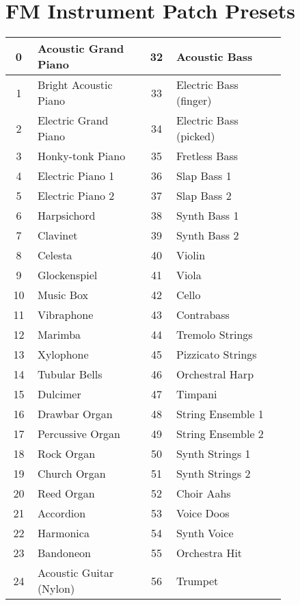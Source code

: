 \chapter{FM Instrument Patch Presets}
\begin{tabular}{|c|p{0.4\linewidth}|c|p{0.4\linewidth}|}
	\hline
	0  &  Acoustic Grand Piano  & 32  &  Acoustic Bass  \\ \hline
	1  &  Bright Acoustic Piano  & 33  &  Electric Bass (finger)  \\ \hline
	2  &  Electric Grand Piano  & 34  &  Electric Bass (picked)  \\ \hline
	3  &  Honky-tonk Piano  & 35  &  Fretless Bass  \\ \hline
	4  &  Electric Piano 1  & 36  &  Slap Bass 1  \\ \hline
	5  &  Electric Piano 2  & 37  &  Slap Bass 2  \\ \hline
	6  &  Harpsichord  & 38  &  Synth Bass 1  \\ \hline
	7  &  Clavinet  & 39  &  Synth Bass 2  \\ \hline
	8  &  Celesta  & 40  &  Violin  \\ \hline
	9  &  Glockenspiel  & 41  &  Viola  \\ \hline
	10  &  Music Box  & 42  &  Cello  \\ \hline
	11  &  Vibraphone  & 43  &  Contrabass  \\ \hline
	12  &  Marimba  & 44  &  Tremolo Strings  \\ \hline
	13  &  Xylophone  & 45  &  Pizzicato Strings  \\ \hline
	14  &  Tubular Bells  & 46  &  Orchestral Harp  \\ \hline
	15  &  Dulcimer  & 47  &  Timpani  \\ \hline
	16  &  Drawbar Organ  & 48  &  String Ensemble 1  \\ \hline
	17  &  Percussive Organ  & 49  &  String Ensemble 2  \\ \hline
	18  &  Rock Organ  & 50  &  Synth Strings 1  \\ \hline
	19  &  Church Organ  & 51  &  Synth Strings 2  \\ \hline
	20  &  Reed Organ  & 52  &  Choir Aahs  \\ \hline
	21  &  Accordion  & 53  &  Voice Doos  \\ \hline
	22  &  Harmonica  & 54  &  Synth Voice  \\ \hline
	23  &  Bandoneon  & 55  &  Orchestra Hit  \\ \hline
	24  &  Acoustic Guitar (Nylon)  & 56  &  Trumpet  \\ \hline

\end{tabular}
